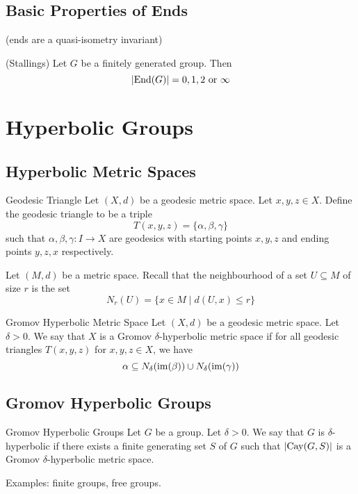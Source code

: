 \documentclass[a4paper]{article}
\begin{document}
\subsection{Basic Properties of Ends}
(ends are a quasi-isometry invariant)

\begin{thm}{(Stallings)}{} Let $G$ be a finitely generated group. Then $$\abs{\text{End}(G)}=0,1,2\text{ or }\infty$$
\end{thm}

\pagebreak
\section{Hyperbolic Groups}
\subsection{Hyperbolic Metric Spaces}
\begin{defn}{Geodesic Triangle}{} Let $(X,d)$ be a geodesic metric space. Let $x,y,z\in X$. Define the geodesic triangle to be a triple $$T(x,y,z)=\{\alpha,\beta,\gamma\}$$ such that $\alpha,\beta,\gamma:I\to X$ are geodesics with starting points $x,y,z$ and ending points $y,z,x$ respectively. 
\end{defn}

Let $(M,d)$ be a metric space. Recall that the neighbourhood of a set $U\subseteq M$ of size $r$ is the set $$N_r(U)=\{x\in M\;|\;d(U,x)\leq r\}$$

\begin{defn}{Gromov Hyperbolic Metric Space}{} Let $(X,d)$ be a geodesic metric space. Let $\delta>0$. We say that $X$ is a Gromov $\delta$-hyperbolic metric space if for all geodesic triangles $T(x,y,z)$ for $x,y,z\in X$, we have $$\alpha\subseteq N_\delta(\operatorname{im}(\beta))\cup N_\delta(\operatorname{im}(\gamma))$$
\end{defn}

\subsection{Gromov Hyperbolic Groups}
\begin{defn}{Gromov Hyperbolic Groups}{} Let $G$ be a group. Let $\delta>0$. We say that $G$ is $\delta$-hyperbolic if there exists a finite generating set $S$ of $G$ such that $\abs{\text{Cay}(G,S)}$ is a Gromov $\delta$-hyperbolic metric space. 
\end{defn}

Examples: finite groups, free groups. 
\end{document}
